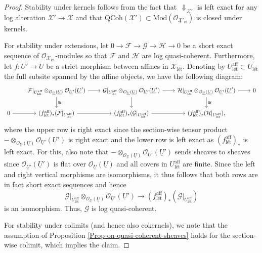 \documentclass[11pt]{amsart}
\theoremstyle{definition}
\theoremstyle{definition}
\DeclareMathOperator{\arrowdown}{\!\Downarrow\!}
\newcommand{\ul}[1]{\underline{#1}}
\begin{document}
\begin{proof}
Stability under kernels follows from the fact that $\arrowdown_{\mathcal{X}'}$ is left exact for any log alteration $\mathcal{X}'\rightarrow \mathcal{X}$ and that $\text{QCoh}(\underline{\mathcal{X}}')\subset \text{Mod}(\mathcal{O}_{\ul{\mathcal{X}}{}'_{\text{\'et}}})$ is closed under kernels.

For stability under extensions, let $0\rightarrow \mathcal{F}\rightarrow\mathcal{G}\rightarrow\mathcal{H}\rightarrow 0$ be a short exact sequence of $\mathcal{O}_{\mathcal{X}_{\text{l\'et}}}$-modules so that $\mathcal{F}$ and $\mathcal{H}$ are log quasi-coherent. Furthermore, let $f\colon U'\rightarrow U$ be a strict morphism between affines in $\mathcal{X}_{\text{l\'et}}$. Denoting by $U^{\text{aff}}_{\text{l\'et}}\subset U_{\text{l\'et}}$ the full subsite spanned by the affine objects, we have the following diagram: 
\begin{equation*}
\begin{tikzcd}[column sep=0.75cm]
            & \mathcal{F}|_{U_{\text{l\'et}}^{\text{aff}}}\otimes_{\mathcal{O}_{\ul{U}}(\ul{U})}\mathcal{O}_{\ul{U}'}(\ul{U}') \arrow[r] \arrow[d, "\cong"] & \mathcal{G}|_{U_{\text{l\'et}}^{\text{aff}}}\otimes_{\mathcal{O}_{\ul{U}}(\ul{U})}\mathcal{O}_{\ul{U}'}(\ul{U}') \arrow[r] \arrow[d] & \mathcal{H}|_{U_{\text{l\'et}}^{\text{aff}}}\otimes_{\mathcal{O}_{\ul{U}}(\ul{U})}\mathcal{O}_{\ul{U}'}(\ul{U}') \arrow[r] \arrow[d, "\cong"] & 0 \\
0 \arrow[r] & {(f_{\text{l\'et}}^{\text{aff}})_*(\mathcal{F}|_{U_{\text{l\'et}}^{\text{aff}}})} \arrow[r]                                                       & {(f_{\text{l\'et}}^{\text{aff}})_*(\mathcal{G}|_{U_{\text{l\'et}}^{\text{aff}}})} \arrow[r]                                              & {(f_{\text{l\'et}}^{\text{aff}})_*(\mathcal{H}|_{U_{\text{l\'et}}^{\text{aff}}})},                                                                 &  
\end{tikzcd}
\end{equation*}
where the upper row is right exact since the section-wise tensor product ${-}\otimes_{\mathcal{O}_{\ul{U}}(\ul{U})}\mathcal{O}_{\ul{U}'}(\ul{U}')$ is right exact and the lower row is left exact as $(f_{\text{l\'et}}^{\text{aff}})_*$ is left exact. For this, also note that ${-}\otimes_{\mathcal{O}_{\ul{U}}(\ul{U})}\mathcal{O}_{\ul{U}'}(\ul{U}')$ sends sheaves to sheaves since $\mathcal{O}_{\ul{U}'}(\ul{U}')$ is flat over $\mathcal{O}_{\ul{U}}(\ul{U})$ and all covers in $U^\text{aff}_{\text{l\'et}}$ are finite. Since the left and right vertical morphisms are isomorphisms, it thus follows that both rows are in fact short exact sequences and hence
$$\mathcal{G}|_{U_{\text{l\'et}}^{\text{aff}}}\otimes_{\mathcal{O}_{\ul{U}}(\ul{U})}\mathcal{O}_{\ul{U}'}(\ul{U}')\longrightarrow (f_{\text{l\'et}}^{\text{aff}})_*(\mathcal{G}|_{U_{\text{l\'et}}^{\text{aff}}})$$
is an isomorphism. Thus, $\mathcal{G}$ is log quasi-coherent.

For stability under colimits (and hence also cokernels), we note that the assumption of Proposition \ref{Prop-on-quasi-coherent-sheaves}
holds for the section-wise colimit, which implies the claim.
\end{proof}
\end{document}
